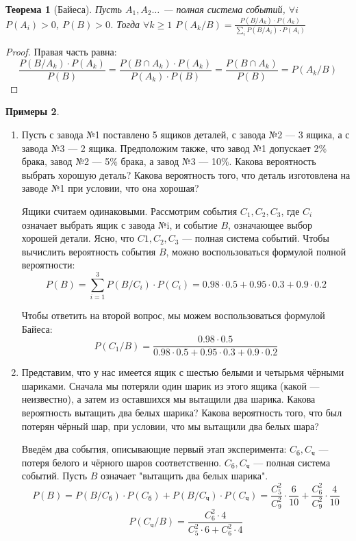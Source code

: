 \documentclass[11pt,openany,a4paper]{scrartcl}
\theoremstyle{plain}
\newtheorem{theorem}{Теорема}[section]
\theoremstyle{definition}
\newtheorem{examples}[theorem]{Примеры}
\begin{document}
\begin{theorem}[Байеса]
    Пусть $A_1, A_2 \ldots$ — полная система событий, $\forall i$ $P(A_i) > 0$, 
    $P(B) > 0$. Тогда $\forall k \geqslant 1$ $P(A_k/B) =
    \frac{P(B/A_k) \cdot P(A_k)}{\sum\limits_i P(B/A_i) \cdot P(A_i)}$
\end{theorem}
\begin{proof}
    Правая часть равна:
    $$
    \frac{P(B/A_k) \cdot P(A_k)}{P(B)} =
    \frac{P(B \cap A_k) \cdot P(A_k)}{P(A_k) \cdot P(B)} =
    \frac{P(B \cap A_k)}{P(B)} = P(A_k/B)
    $$
\end{proof}
\begin{examples}
    \begin{enumerate}
        \item Пусть с завода №1 поставлено 5 ящиков деталей, с завода №2 — 3 ящика,
        а с завода №3 — 2 ящика. Предположим также, что завод №1 допускает 2\% брака,
        завод №2 — 5\% брака, а завод №3 — 10\%. Какова вероятность выбрать хорошую
        деталь? Какова вероятность того, что деталь изготовлена на заводе №1 при
        условии, что она хорошая?
        
        Ящики считаем одинаковыми. Рассмотрим события $C_1, C_2, C_3$, где $C_i$
        означает выбрать ящик с завода №i, и событие $B$, означающее выбор хорошей 
        детали. Ясно, что $C1, C_2, C_3$ — полная система событий. Чтобы вычислить 
        вероятность события $B$, можно воспользоваться формулой полной вероятности:
        $$
        P(B) = \sum_{i = 1}^3 P(B/C_i) \cdot P(C_i) = 
        0.98 \cdot 0.5 + 0.95 \cdot 0.3 + 0.9 \cdot 0.2
        $$
        
        Чтобы ответить на второй вопрос, мы можем воспользоваться формулой Байеса:
        $$
        P(C_1/B) = \frac{0.98 \cdot 0.5}
        {0.98 \cdot 0.5 + 0.95 \cdot 0.3 + 0.9 \cdot 0.2}
        $$
        
        \item Представим, что у нас имеется ящик с шестью белыми и четырьмя чёрными 
        шариками. Сначала мы потеряли один шарик из этого ящика (какой — неизвестно),
        а затем из оставшихся мы вытащили два шарика. Какова вероятность вытащить
        два белых шарика? Какова вероятность того, что был потерян чёрный шар, при
        условии, что мы вытащили два белых шара?
        
        Введём два события, описывающие первый этап эксперимента: $C_б, C_ч$ — потеря
        белого и чёрного шаров соответственно. $C_б, C_ч$ — полная система событий.
        Пусть $B$ означает "вытащить два белых шарика".
        $$
        P(B) = P(B/C_б) \cdot P(C_б) + P(B/C_ч) \cdot P(C_ч) =
        \frac{C_5^2}{C_9^2} \cdot \frac{6}{10} + \frac{C_6^2}{C_9^2} \cdot \frac{4}{10}
        $$
        $$
        P(C_ч/B) = \frac{C_6^2 \cdot 4}{C_5^2 \cdot 6 + C_6^2 \cdot 4}
        $$
    \end{enumerate}
\end{examples}
\end{document}
